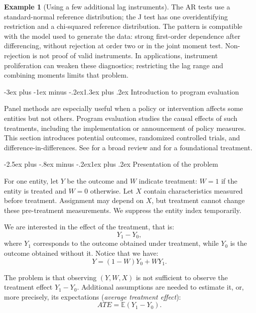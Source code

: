 \documentclass[
  11pt,
]{book}
\makeatletter
\renewcommand\section{\@startsection{section}{1}{\z@}
  {-3ex plus -1ex minus -.2ex}{1.3ex plus .2ex}
  {\normalfont\Large\bfseries\color{TextbookInk}}}
\renewcommand\subsection{\@startsection{subsection}{2}{\z@}
  {-2.5ex plus -.8ex minus -.2ex}{1ex plus .2ex}
  {\normalfont\large\bfseries\color{TextbookInk}}}
\theoremstyle{definition}
\theoremstyle{definition}
\newtheorem{example}{Example}[chapter]
\theoremstyle{definition}
\theoremstyle{definition}
\theoremstyle{remark}
\makeatother
\begin{document}
\begin{example}[Using a few additional lag instruments]
The AR tests use a standard-normal reference distribution; the J test has one overidentifying restriction and a chi-squared reference distribution. The pattern is compatible with the model used to generate the data: strong first-order dependence after differencing, without rejection at order two or in the joint moment test. Non-rejection is not proof of valid instruments. In applications, instrument proliferation can weaken these diagnostics; restricting the lag range and combining moments limits that problem.
\end{example}

\section{Introduction to program evaluation}\label{program-evaluation}

Panel methods are especially useful when a policy or intervention affects some entities but not others. Program evaluation studies the causal effects of such treatments, including the implementation or announcement of policy measures. This section introduces potential outcomes, randomized controlled trials, and difference-in-differences. See \citet{Abadie_Cattaneo_2018} for a broad review and \citet{angrist_mostly_2008} for a foundational treatment.

\subsection{Presentation of the problem}\label{presentation-of-the-problem}

For one entity, let \(Y\) be the outcome and \(W\) indicate treatment: \(W=1\) if the entity is treated and \(W=0\) otherwise. Let \(X\) contain characteristics measured before treatment. Assignment may depend on \(X\), but treatment cannot change these pre-treatment measurements. We suppress the entity index temporarily.

We are interested in the effect of the treatment, that is:
\[
Y_1 - Y_0,
\]
where \(Y_1\) corresponds to the outcome obtained under treatment, while \(Y_0\) is the outcome obtained without it. Notice that we have:
\[
Y = (1-W) Y_0 + W Y_1.
\]

The problem is that observing \((Y,W,X)\) is not sufficient to observe the treatment effect \(Y_1 - Y_0\). Additional assumptions are needed to estimate it, or, more precisely, its expectations (\emph{average treatment effect}):
\[
ATE = \mathbb{E}(Y_1 - Y_0).
\]
\end{document}
